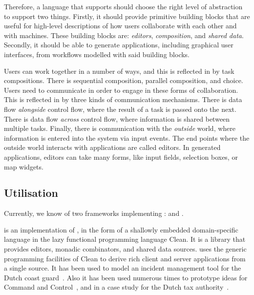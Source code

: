 Therefore,
a language that supports \TOP should choose the right level of abstraction to support two things.
Firstly, it should provide primitive building blocks that are useful for high-level descriptions of how users collaborate with each other and with machines.
These building blocks are: \emph{editors}, \emph{composition}, and \emph{shared data}.
Secondly, it should be able to generate applications, including graphical user interfaces, from workflows modelled with said building blocks.

Users can work together in a number of ways, and this is reflected in \TOP by task compositions.
There is sequential composition, parallel composition, and choice.
Users need to communicate in order to engage in these forms of collaboration.
This is reflected in \TOP by three kinds of communication mechanisms.
There is data flow \emph{alongside} control flow, where the result of a task is passed onto the next.
There is data flow \emph{across} control flow, where information is shared between multiple tasks.
Finally, there is communication with the \emph{outside} world, where information is entered into the system via input events.
The end points where the outside world interacts with \TOP applications are called editors.
In generated applications, editors can take many forms, like input fields, selection boxes, or map widgets.



\subsection{Utilisation}


Currently, we know of two frameworks implementing \TOP: \ITASKS and \MTASKS.

\ITASKS is an implementation of \TOP, in the form of a shallowly embedded domain-specific language in the lazy functional programming language Clean.
It is a library that provides editors, monadic combinators, and shared data sources.
\ITASKS uses the generic programming facilities of Clean to derive rich client and server applications from a single source.
It has been used to model an incident management tool for the Dutch coast guard~\cite{conf/iscram/LijnseJP12}.
Also it has been used numerous times to prototype ideas for Command and Control~\cite{theses/nlda/Kool17, theses/radboud/Stutterheim17}, and in a case study for the Dutch tax authority~\cite{conf/sfp/StutterheimAP17}.

